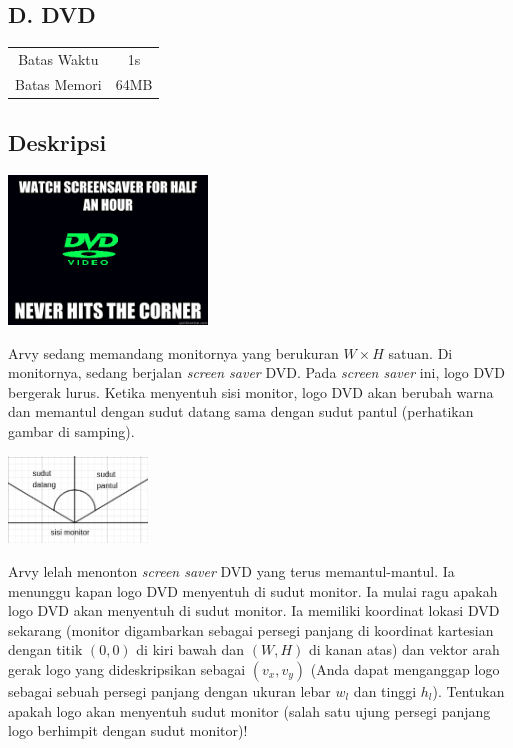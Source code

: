\documentclass{article}
\begin{document}
\begin{center}
    \section*{D. DVD} %

    \begin{tabular}{ | c c | }
        \hline
        Batas Waktu  & 1s \\    %
        Batas Memori & 64MB \\  %
        \hline
    \end{tabular}
\end{center}

\subsection*{Deskripsi}

\begin{center}
    \includegraphics[width=200px]{meme}
\end{center}

\begin{multicols}{2}

Arvy sedang memandang monitornya yang berukuran $W \times H$ satuan.
Di monitornya, sedang berjalan \textit{screen saver} DVD.
Pada \textit{screen saver} ini, logo DVD bergerak lurus.
Ketika menyentuh sisi monitor, logo DVD akan berubah warna dan memantul dengan sudut datang sama dengan sudut pantul (perhatikan gambar di samping).

\begin{center}
    \includegraphics[width=140px]{pantul}
\end{center}
\end{multicols}

Arvy lelah menonton \textit{screen saver} DVD yang terus memantul-mantul.
Ia menunggu kapan logo DVD menyentuh di sudut monitor.
Ia mulai ragu apakah logo DVD akan menyentuh di sudut monitor.
Ia memiliki koordinat lokasi DVD sekarang (monitor digambarkan sebagai persegi panjang di koordinat kartesian dengan titik $(0, 0)$ di kiri bawah dan $(W, H)$ di kanan atas) dan vektor arah gerak logo yang dideskripsikan sebagai $(v_x, v_y)$ (Anda dapat menganggap logo sebagai sebuah persegi panjang dengan ukuran lebar $w_l$ dan tinggi $h_l$).
Tentukan apakah logo akan menyentuh sudut monitor (salah satu ujung persegi panjang logo berhimpit dengan sudut monitor)!
\end{document}
